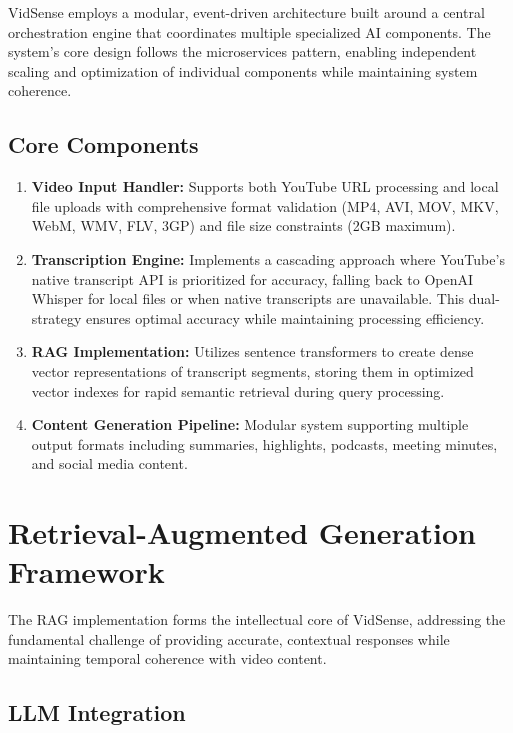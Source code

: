 \documentclass{bscs}
\begin{document}
VidSense employs a modular, event-driven architecture built around a central orchestration engine that coordinates multiple specialized AI components. The system's core design follows the microservices pattern, enabling independent scaling and optimization of individual components while maintaining system coherence.

\subsection{Core Components}

\begin{enumerate}[label=\arabic*.]
\item \textbf{Video Input Handler:} Supports both YouTube URL processing and local file uploads with comprehensive format validation (MP4, AVI, MOV, MKV, WebM, WMV, FLV, 3GP) and file size constraints (2GB maximum).

\item \textbf{Transcription Engine:} Implements a cascading approach where YouTube's native transcript API is prioritized for accuracy, falling back to OpenAI Whisper for local files or when native transcripts are unavailable. This dual-strategy ensures optimal accuracy while maintaining processing efficiency.

\item \textbf{RAG Implementation:} Utilizes sentence transformers to create dense vector representations of transcript segments, storing them in optimized vector indexes for rapid semantic retrieval during query processing.

\item \textbf{Content Generation Pipeline:} Modular system supporting multiple output formats including summaries, highlights, podcasts, meeting minutes, and social media content.
\end{enumerate}

\section{Retrieval-Augmented Generation Framework}

The RAG implementation forms the intellectual core of VidSense, addressing the fundamental challenge of providing accurate, contextual responses while maintaining temporal coherence with video content.

\subsection{LLM Integration}
\end{document}
